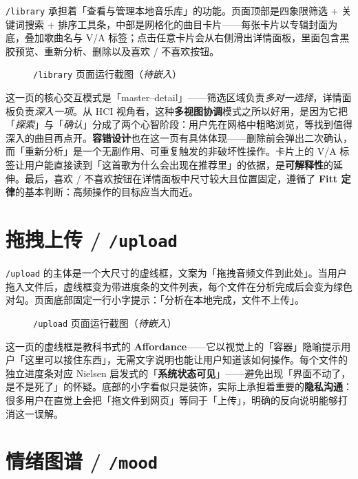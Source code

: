 \texttt{/library} 承担着「查看与管理本地音乐库」的功能。页面顶部是四象限筛选 + 关键词搜索 + 排序工具条，中部是网格化的曲目卡片——每张卡片以专辑封面为底，叠加歌曲名与 V/A 标签；点击任意卡片会从右侧滑出详情面板，里面包含黑胶预览、重新分析、删除以及喜欢 / 不喜欢按钮。

\begin{figure}[!htb]
  \centering
  \fbox{\rule{0pt}{6cm}\hspace{12.5cm}}
  \caption{\texttt{/library} 页面运行截图（\textit{待嵌入}）}\label{fig:library}
\end{figure}

这一页的核心交互模式是「master--detail」——筛选区域负责\emph{多对一选择}，详情面板负责\emph{深入一项}。从 HCI 视角看，这种\textbf{多视图协调}模式之所以好用，是因为它把「\emph{探索}」与「\emph{确认}」分成了两个心智阶段：用户先在网格中粗略浏览，等找到值得深入的曲目再点开。\textbf{容错设计}也在这一页有具体体现——删除前会弹出二次确认，而「重新分析」是一个无副作用、可重复触发的非破坏性操作。卡片上的 V/A 标签让用户能直接读到「这首歌为什么会出现在推荐里」的依据，是\textbf{可解释性}的延伸。最后，喜欢 / 不喜欢按钮在详情面板中尺寸较大且位置固定，遵循了 \textbf{Fitt 定律}的基本判断：高频操作的目标应当大而近。

\section{拖拽上传 / \texttt{/upload}}

\texttt{/upload} 的主体是一个大尺寸的虚线框，文案为「拖拽音频文件到此处」。当用户拖入文件后，虚线框变为带进度条的文件列表，每个文件在分析完成后会变为绿色对勾。页面底部固定一行小字提示：「分析在本地完成，文件不上传」。

\begin{figure}[!htb]
  \centering
  \fbox{\rule{0pt}{5cm}\hspace{12.5cm}}
  \caption{\texttt{/upload} 页面运行截图（\textit{待嵌入}）}\label{fig:upload}
\end{figure}

这一页的虚线框是教科书式的 \textbf{Affordance}——它以视觉上的「容器」隐喻提示用户「这里可以接住东西」，无需文字说明也能让用户知道该如何操作。每个文件的独立进度条对应 Nielsen 启发式的「\textbf{系统状态可见}」——避免出现「界面不动了，是不是死了」的怀疑。底部的小字看似只是装饰，实际上承担着重要的\textbf{隐私沟通}：很多用户在直觉上会把「拖文件到网页」等同于「上传」，明确的反向说明能够打消这一误解。

\section{情绪图谱 / \texttt{/mood}}

